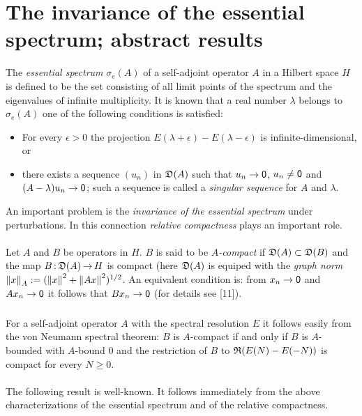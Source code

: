 \documentclass[11pt,twoside]{article}
\begin{document}
\section{The invariance of the essential spectrum; abstract results}           %
The \textit{essential spectrum} $\sigma_e(A)$ of a self-adjoint operator $A$
in a Hilbert space $H$ is defined to be the set consisting of all limit points
of the spectrum and the eigenvalues of infinite multiplicity.
It is known that a real number $\lambda$ belongs to $\sigma_e(A)$ \iff one of
the following conditions is satisfied:

\begin{itemize}[leftmargin=6mm]
\item[3.1]
For every $\epsilon > 0$
the projection $E(\lambda+\epsilon)-E(\lambda-\epsilon)$
is infinite-dimensional, or
\item[3.2]
there exists a sequence $(u_n)$ in $\mathfrak{D}(A)$ such that $u_n \to {\mathsf{0}}$,
$u_n \neq {\mathsf{0}}$ and $(A-\lambda)u_n \to {\mathsf{0}}$;
such a sequence is called a \textit{singular sequence} for $A$ and $\lambda$.
\end{itemize}
An important problem is the \textit{invariance of the essential spectrum}
under perturbations.
In this connection \textit{relative compactness} plays an important role.

\paragraph*{}
Let $A$ and $B$ be operators in $H$.
$B$ is said to be $A$\textit{-compact} if $\mathfrak{D}(A) \subset \mathfrak{D}(B)$
and the map $B {\,:\,} \mathfrak{D}(A) {\,\to\,} H$ is compact
(here $\mathfrak{D}(A)$ is equiped with the \textit{graph norm}
$\left\lVert x \right\rVert_A := (\left\lVert x \right\rVert^2 + \left\lVert Ax \right\rVert^2)^{1/2}$.
An equivalent condition is:
from $x_n\to {\mathsf{0}}$ and $Ax_n\to {\mathsf{0}}$ it follows that $Bx_n \to {\mathsf{0}}$
(for details see [11]).

\subparagraph*{}
For a self-adjoint operator $A$ with the spectral resolution $E$ it follows
easily from the von Neumann spectral theorem:
$B$ is $A$-compact if and only if $B$ is $A$-bounded with $A$-bound $0$ and
the restriction of $B$ to $\mathfrak{R}(E(N)-E(-N))$ is compact for every $N \geq 0$.

\paragraph*{}
The following result is well-known.
It follows immediately from the above characterizations
of the essential spectrum and of the relative compactness.
\end{document}

